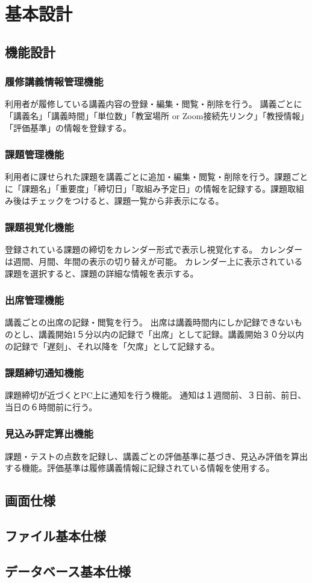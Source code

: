 \documentclass[a4paper, 11pt, titlepage]{jsarticle}
\begin{document}
\clearpage

\section{基本設計}
\subsection{機能設計}
\subsubsection{履修講義情報管理機能}
利用者が履修している講義内容の登録・編集・閲覧・削除を行う。
講義ごとに「講義名」「講義時間」「単位数」「教室場所 or Zoom接続先リンク」「教授情報」「評価基準」の情報を登録する。
\subsubsection{課題管理機能}
利用者に課せられた課題を講義ごとに追加・編集・閲覧・削除を行う。課題ごとに「課題名」「重要度」「締切日」「取組み予定日」の情報を記録する。課題取組み後はチェックをつけると、課題一覧から非表示になる。
\subsubsection{課題視覚化機能}
登録されている課題の締切をカレンダー形式で表示し視覚化する。
カレンダーは週間、月間、年間の表示の切り替えが可能。
カレンダー上に表示されている課題を選択すると、課題の詳細な情報を表示する。
\subsubsection{出席管理機能}
講義ごとの出席の記録・閲覧を行う。
出席は講義時間内にしか記録できないものとし、講義開始1５分以内の記録で「出席」として記録。講義開始３０分以内の記録で「遅刻」、それ以降を「欠席」として記録する。
\subsubsection{課題締切通知機能}
課題締切が近づくとPC上に通知を行う機能。
通知は１週間前、３日前、前日、当日の６時間前に行う。
\subsubsection{見込み評定算出機能}
課題・テストの点数を記録し、講義ごとの評価基準に基づき、見込み評価を算出する機能。評価基準は履修講義情報に記録されている情報を使用する。

\subsection{画面仕様}

\subsection{ファイル基本仕様}

\subsection{データベース基本仕様}
\end{document}
